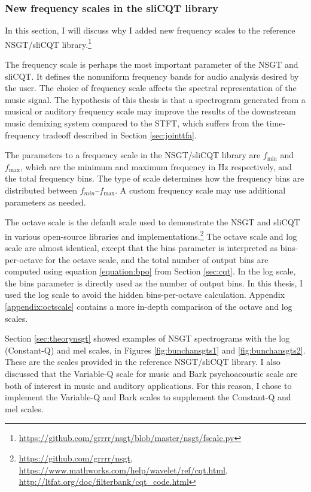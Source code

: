 \documentclass[report.tex]{subfiles}
\begin{document}
\subsubsection{New frequency scales in the sliCQT library}
\label{sec:improvelib}

In this section, I will discuss why I added new frequency scales to the reference NSGT/sliCQT library.\footnote{\url{https://github.com/grrrr/nsgt/blob/master/nsgt/fscale.py}}

The frequency scale is perhaps the most important parameter of the NSGT and sliCQT. It defines the nonuniform frequency bands for audio analysis desired by the user. The choice of frequency scale affects the spectral representation of the music signal. The hypothesis of this thesis is that a spectrogram generated from a musical or auditory frequency scale may improve the results of the downstream music demixing system compared to the STFT, which suffers from the time-frequency tradeoff described in Section \ref{sec:jointtfa}.

The parameters to a frequency scale in the NSGT/sliCQT library are $f_{\text{min}}$ and $f_{\text{max}}$, which are the minimum and maximum frequency in Hz respectively, and the total frequency bins. The type of scale determines how the frequency bins are distributed between $f_{min}$--$f_{\text{max}}$. A custom frequency scale may use additional parameters as needed.

The octave scale is the default scale used to demonstrate the NSGT and sliCQT \parencite{balazs, slicq} in various open-source libraries and implementations.\footnote{\url{https://github.com/grrrr/nsgt}, \url{https://www.mathworks.com/help/wavelet/ref/cqt.html}, \url{http://ltfat.org/doc/filterbank/cqt_code.html}} The octave scale and log scale are almost identical, except that the bins parameter is interpreted as bins-per-octave for the octave scale, and the total number of output bins are computed using equation \eqref{equation:bpo} from Section \ref{sec:cqt}. In the log scale, the bins parameter is directly used as the number of output bins. In this thesis, I used the log scale to avoid the hidden bins-per-octave calculation. Appendix \ref{appendix:octscale} contains a more in-depth comparison of the octave and log scales.

Section \ref{sec:theorynsgt} showed examples of NSGT spectrograms with the log (Constant-Q) and mel scales, in Figures \ref{fig:bunchansgts1} and \ref{fig:bunchansgts2}. These are the scales provided in the reference NSGT/sliCQT library. I also discussed that the Variable-Q scale for music and Bark psychoacoustic scale are both of interest in music and auditory applications. For this reason, I chose to implement the Variable-Q and Bark scales to supplement the Constant-Q and mel scales.
\end{document}
